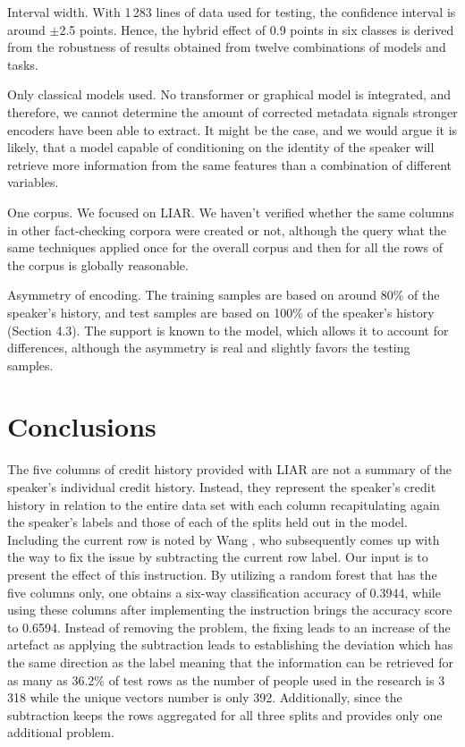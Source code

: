 \documentclass[10pt,twocolumn,twoside,a4paper]{article}
\begin{document}
Interval width. With 1\,283 lines of data used for testing, the confidence interval is around $\pm$2.5 points. Hence, the hybrid effect of 0.9 points in six classes is derived from the robustness of results obtained from twelve combinations of models and tasks.

Only classical models used. No transformer or graphical model is integrated, and therefore, we cannot determine the amount of corrected metadata signals stronger encoders have been able to extract. It might be the case, and we would argue it is likely, that a model capable of conditioning on the identity of the speaker will retrieve more information from the same features than a combination of different variables.

One corpus. We focused on LIAR. We haven't verified whether the same columns in other fact-checking corpora were created or not, although the query what the same techniques applied once for the overall corpus and then for all the rows of the corpus is globally reasonable.

Asymmetry of encoding. The training samples are based on around 80\% of the speaker's history, and test samples are based on 100\% of the speaker's history (Section 4.3). The support is known to the model, which allows it to account for differences, although the asymmetry is real and slightly favors the testing samples.

\section{Conclusions}

The five columns of credit history provided with LIAR are not a summary of the speaker's individual credit history. Instead, they represent the speaker's credit history in relation to the entire data set with each column recapitulating again the speaker's labels and those of each of the splits held out in the model. Including the current row is noted by Wang \cite{wang2017liar}, who subsequently comes up with the way to fix the issue by subtracting the current row label. Our input is to present the effect of this instruction. By utilizing a random forest that has the five columns only, one obtains a six-way classification accuracy of 0.3944, while using these columns after implementing the instruction brings the accuracy score to 0.6594. Instead of removing the problem, the fixing leads to an increase of the artefact as applying the subtraction leads to establishing the deviation which has the same direction as the label meaning that the information can be retrieved for as many as 36.2\% of test rows as the number of people used in the research is 3\,318 while the unique vectors number is only 392. Additionally, since the subtraction keeps the rows aggregated for all three splits and provides only one additional problem.
\end{document}
